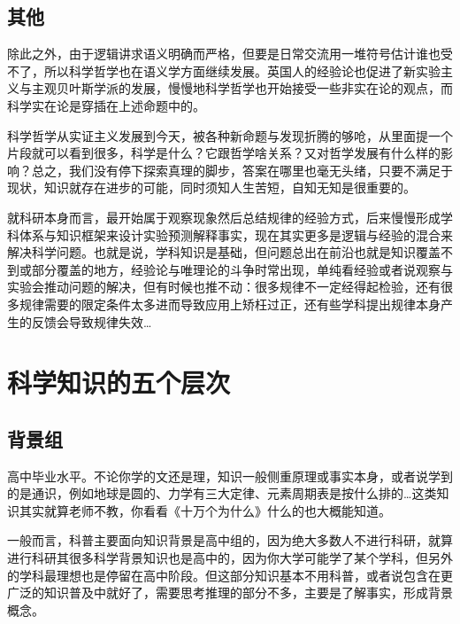 \documentclass[]{tufte-book}
\begin{document}
\hypertarget{ux5176ux4ed6}{%
\subsection{其他}\label{ux5176ux4ed6}}

除此之外，由于逻辑讲求语义明确而严格，但要是日常交流用一堆符号估计谁也受不了，所以科学哲学也在语义学方面继续发展。英国人的经验论也促进了新实验主义与主观贝叶斯学派的发展，慢慢地科学哲学也开始接受一些非实在论的观点，而科学实在论是穿插在上述命题中的。

科学哲学从实证主义发展到今天，被各种新命题与发现折腾的够呛，从里面提一个片段就可以看到很多，科学是什么？它跟哲学啥关系？又对哲学发展有什么样的影响？总之，我们没有停下探索真理的脚步，答案在哪里也毫无头绪，只要不满足于现状，知识就存在进步的可能，同时须知人生苦短，自知无知是很重要的。

就科研本身而言，最开始属于观察现象然后总结规律的经验方式，后来慢慢形成学科体系与知识框架来设计实验预测解释事实，现在其实更多是逻辑与经验的混合来解决科学问题。也就是说，学科知识是基础，但问题总出在前沿也就是知识覆盖不到或部分覆盖的地方，经验论与唯理论的斗争时常出现，单纯看经验或者说观察与实验会推动问题的解决，但有时候也推不动：很多规律不一定经得起检验，还有很多规律需要的限定条件太多进而导致应用上矫枉过正，还有些学科提出规律本身产生的反馈会导致规律失效\ldots{}

\hypertarget{ux79d1ux5b66ux77e5ux8bc6ux7684ux4e94ux4e2aux5c42ux6b21}{%
\section{科学知识的五个层次}\label{ux79d1ux5b66ux77e5ux8bc6ux7684ux4e94ux4e2aux5c42ux6b21}}

\hypertarget{ux80ccux666fux7ec4}{%
\subsection{背景组}\label{ux80ccux666fux7ec4}}

高中毕业水平。不论你学的文还是理，知识一般侧重原理或事实本身，或者说学到的是通识，例如地球是圆的、力学有三大定律、元素周期表是按什么排的\ldots{}这类知识其实就算老师不教，你看看《十万个为什么》什么的也大概能知道。

一般而言，科普主要面向知识背景是高中组的，因为绝大多数人不进行科研，就算进行科研其很多科学背景知识也是高中的，因为你大学可能学了某个学科，但另外的学科最理想也是停留在高中阶段。但这部分知识基本不用科普，或者说包含在更广泛的知识普及中就好了，需要思考推理的部分不多，主要是了解事实，形成背景概念。
\end{document}
